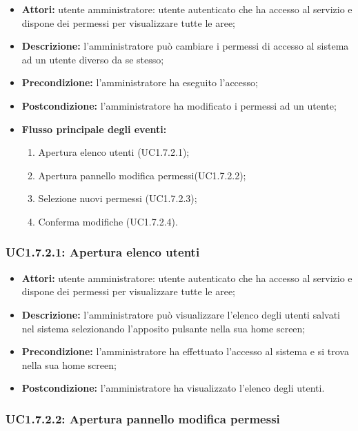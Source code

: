 \begin{itemize}
    \item \textbf{Attori:} utente amministratore: utente autenticato che ha accesso al servizio e dispone dei permessi per visualizzare tutte le aree;
    \item \textbf{Descrizione:} l'amministratore può cambiare i permessi di accesso al sistema ad un utente diverso da se stesso;
    \item \textbf{Precondizione:} l'amministratore ha eseguito l'accesso;
    \item \textbf{Postcondizione:} l'amministratore ha modificato i permessi ad un utente;
    \item \textbf{Flusso principale degli eventi:}
    \begin{enumerate}
        \item Apertura elenco utenti (UC1.7.2.1);
        \item Apertura pannello modifica permessi(UC1.7.2.2);
        \item Selezione nuovi permessi (UC1.7.2.3);
        \item Conferma modifiche (UC1.7.2.4).
    \end{enumerate}
\end{itemize}

\subsubsection{UC1.7.2.1: Apertura elenco utenti}

\begin{itemize}
    \item \textbf{Attori:} utente amministratore: utente autenticato che ha accesso al servizio e dispone dei permessi per visualizzare tutte le aree;
    \item \textbf{Descrizione:} l'amministratore può visualizzare l'elenco degli utenti salvati nel sistema selezionando l'apposito pulsante nella sua home screen;
    \item \textbf{Precondizione:} l'amministratore ha effettuato l'accesso al sistema e si trova nella sua home screen;
    \item \textbf{Postcondizione:} l'amministratore ha visualizzato l'elenco degli utenti.
\end{itemize}

\subsubsection{UC1.7.2.2: Apertura pannello modifica permessi}

